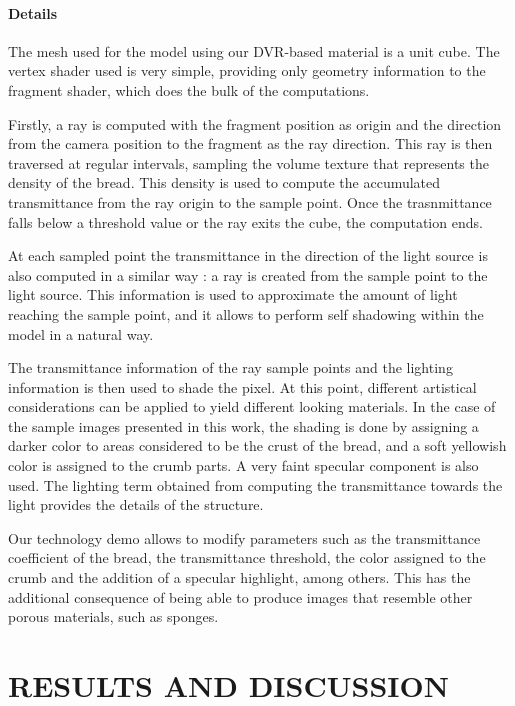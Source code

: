 \documentclass[oneside,a4paper,english,links]{amca}
\begin{document}
\paragraph{Details}

The mesh used for the model using our DVR-based material is a unit
cube. The vertex shader used is very simple, providing only geometry
information to the fragment shader, which does the bulk of the
computations. 

Firstly, a ray is computed with the fragment position as origin and
the direction from the camera position to the fragment as the ray
direction. This ray is then traversed at regular intervals, sampling
the volume texture that represents the density of the bread. This
density is used to compute the accumulated transmittance from the ray
origin to the sample point. Once the trasnmittance falls below a
threshold value or the ray exits the cube, the computation ends.

At each sampled point the transmittance in the direction of the light
source is also computed in a similar way : a ray is created from the
sample point to the light source. This information is used to
approximate the amount of light reaching the sample point, and it
allows to perform self shadowing within the model in a natural
way. 

The transmittance information of the ray sample points and the
lighting information is then used to shade the pixel. At this point,
different artistical considerations can be applied to yield different
looking materials. In the case of the sample images presented
in this work, the shading is done by assigning a darker color to areas
considered to be the crust of the bread, and a soft yellowish color is
assigned to the crumb parts. A very faint specular component is also
used. The lighting term obtained from computing the transmittance
towards the light provides the details of the structure.

Our technology demo allows to modify parameters such as the
transmittance coefficient of the bread, the transmittance
threshold, the color assigned to the crumb and the addition of a
specular highlight, among others. This has the additional consequence
of being able to produce images that resemble other porous materials,
such as sponges.

\section{RESULTS AND DISCUSSION}
\end{document}
